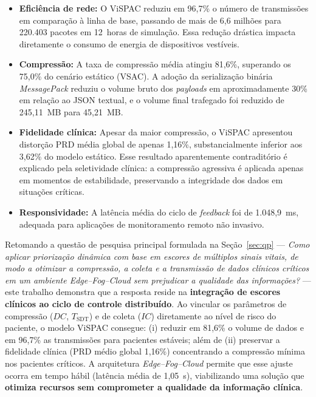 \documentclass[twoside,english,brazilian]{UNISINOSmonografia}
\begin{document}
\begin{itemize}
    \item \textbf{Eficiência de rede:} O ViSPAC reduziu em 96,7\% o número de transmissões em comparação à linha de base, passando de mais de 6,6 milhões para 220.403 pacotes em 12~horas de simulação. Essa redução drástica impacta diretamente o consumo de energia de dispositivos vestíveis.

    \item \textbf{Compressão:} A taxa de compressão média atingiu 81,6\%, superando os 75,0\% do cenário estático (VSAC). A adoção da serialização binária \textit{MessagePack} reduziu o volume bruto dos \textit{payloads} em aproximadamente 30\% em relação ao JSON textual, e o volume final trafegado foi reduzido de 245,11~MB para 45,21~MB.

    \item \textbf{Fidelidade clínica:} Apesar da maior compressão, o ViSPAC apresentou distorção PRD média global de apenas 1,16\%, substancialmente inferior aos 3,62\% do modelo estático. Esse resultado aparentemente contraditório é explicado pela seletividade clínica: a compressão agressiva é aplicada apenas em momentos de estabilidade, preservando a integridade dos dados em situações críticas.

    \item \textbf{Responsividade:} A latência média do ciclo de \textit{feedback} foi de 1.048,9~ms, adequada para aplicações de monitoramento remoto não invasivo.
\end{itemize}

Retomando a questão de pesquisa principal formulada na Seção~\ref{sec:qp} --- \textit{Como aplicar priorização dinâmica com base em escores de múltiplos sinais vitais, de modo a otimizar a compressão, a coleta e a transmissão de dados clínicos críticos em um ambiente Edge--Fog--Cloud sem prejudicar a qualidade das informações?} --- este trabalho demonstra que a resposta reside na \textbf{integração de escores clínicos ao ciclo de controle distribuído}. Ao vincular os parâmetros de compressão ($DC$, $T_{\text{SDT}}$) e de coleta ($IC$) diretamente ao nível de risco do paciente, o modelo ViSPAC consegue: (i) reduzir em 81,6\% o volume de dados e em 96,7\% as transmissões para pacientes estáveis; além de (ii) preservar a fidelidade clínica (PRD médio global 1,16\%) concentrando a compressão mínima nos pacientes críticos. A arquitetura \textit{Edge--Fog--Cloud} permite que esse ajuste ocorra em tempo hábil (latência média de 1,05~s), viabilizando uma solução que \textbf{otimiza recursos sem comprometer a qualidade da informação clínica}.
\end{document}
